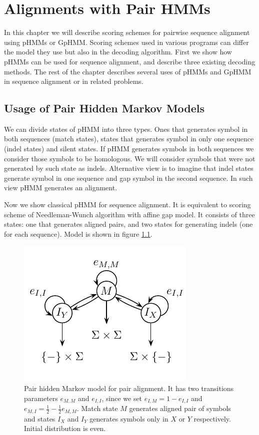 \chapter{Alignments with Pair HMMs}\label{CHAPTER:PAIRHMM}

In this chapter we will describe scoring schemes for pairwise sequence alignment
using pHMMs or GpHMM. Scoring schemes used in various programs can differ the
model they use but also in the decoding algorithm. First we show how pHMMs can
be used for sequence alignment, and describe three existing  decoding methods.
The rest of the chapter describes several uses of pHMMs and GpHMM in sequence
alignment or in related problems.

\section{Usage of Pair Hidden Markov Models}\label{SECTION:SIMPLEPHMM}

We can divide states of pHMM into three types.  Ones that generates symbol in
both sequences (match states), states that generates symbol in only one sequence
(indel states) and silent
states. If pHMM generates  symbols in both sequences we consider those symbols
to be homologous. We will consider symbols that were not generated by such state
as indels. Alternative view is to imagine that indel states generate symbol in
one sequence and gap symbol in the second sequence. In such view pHMM generates
an alignment.

Now we show classical pHMM for sequence alignment. It is equivalent to scoring
scheme of Needleman-Wunch algorithm with affine gap model. It consists of three
states: one that generates aligned pairs, and two states for generating
indels (one for each sequence). Model is shown in figure \ref{FIGURE:SIMPLEPHMM}. 

\begin{figure}
\begin{center}
\includegraphics{../figures/pairHMM.pdf}
\end{center}
\caption[Simple pair HMM model for alignment]{Pair hidden Markov model for pair alignment. It has two transitions
parameters $e_{M,M}$ and $e_{I,I}$, since we set $e_{I,M} = 1 - e_{I,I}$ and
$e_{M,I}=\frac12-\frac12e_{M,M}$. Match state $M$ generates aligned pair of symbols
and states $I_X$ and $I_Y$ generates symbols only in $X$ or $Y$ respectively.
Initial distribution is even.
}\label{FIGURE:SIMPLEPHMM}
\end{figure}

